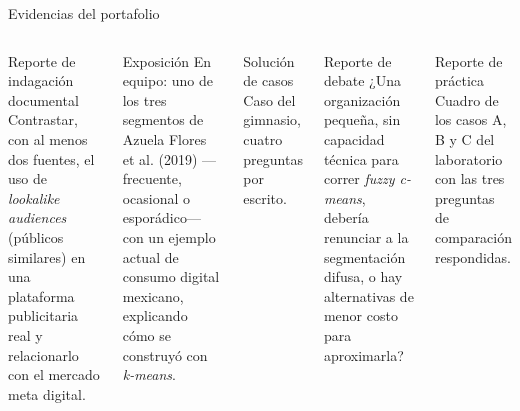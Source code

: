 \documentclass[aspectratio=169,xcolor=dvipsnames]{beamer}
\begin{document}
\begin{frame}{Evidencias del portafolio}
\small
\begin{columns}[T]
  \begin{block}{Reporte de indagación documental}
    \scriptsize Contrastar, con al menos dos fuentes, el uso de \textit{lookalike audiences} (públicos similares) en una plataforma publicitaria real y relacionarlo con el mercado meta digital.
  \end{block}
  \begin{block}{Exposición}
    \scriptsize En equipo: uno de los tres segmentos de Azuela Flores et al. (2019) —frecuente, ocasional o esporádico— con un ejemplo actual de consumo digital mexicano, explicando cómo se construyó con \textit{k-means}.
  \end{block}
  \begin{block}{Solución de casos}
    \scriptsize Caso del gimnasio, cuatro preguntas por escrito.
  \end{block}
  \begin{block}{Reporte de debate}
    \scriptsize ¿Una organización pequeña, sin capacidad técnica para correr \textit{fuzzy c-means}, debería renunciar a la segmentación difusa, o hay alternativas de menor costo para aproximarla?
  \end{block}
  \begin{block}{Reporte de práctica}
    \scriptsize Cuadro de los casos A, B y C del laboratorio con las tres preguntas de comparación respondidas.
  \end{block}
\end{columns}
\end{frame}
\end{document}
